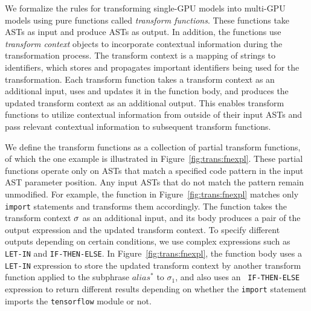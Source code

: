 We formalize the rules for transforming single-GPU models into multi-GPU
models using pure functions called {\it transform functions}. 
These functions take ASTs as input and produce ASTs as output. 
In addition, the functions use {\it transform context} objects to incorporate
contextual information during the transformation process. 
The transform context is a mapping of strings to identifiers, which stores and
propagates important identifiers being used for the transformation.
Each transform function takes a transform context as an additional input, uses
and updates it in the function body, and produces the updated transform context
as an additional output.
This enables transform functions to utilize contextual information from outside
of their input ASTs and pass relevant contextual information to subsequent
transform functions.

We define the transform functions as a collection of partial transform
functions, of which the one example is illustrated in
Figure~\ref{fig:trans:fnexpl}. 
These partial functions operate only on ASTs that match a specified code
pattern in the input AST parameter position. 
Any input ASTs that do not match the pattern remain unmodified. 
For example, the function in Figure~\ref{fig:trans:fnexpl} matches only {\tt
import} statements and transforms them accordingly. 
The function takes the transform context $\sigma$ as an additional input, and
its body produces a pair of the output expression and the updated transform
context. 
To specify different outputs depending on certain conditions, we use complex
expressions such as {\tt LET-IN} and {\tt IF-THEN-ELSE}. 
In Figure~\ref{fig:trans:fnexpl}, the function body uses a {\tt LET-IN}
expression to store the updated transform context by another transform function
applied to the subphrase $alias^*$ to $\sigma_1$, and also uses an {\tt
IF-THEN-ELSE} expression to return different results depending on whether the
{\tt import} statement imports the {\tt tensorflow} module or not.

